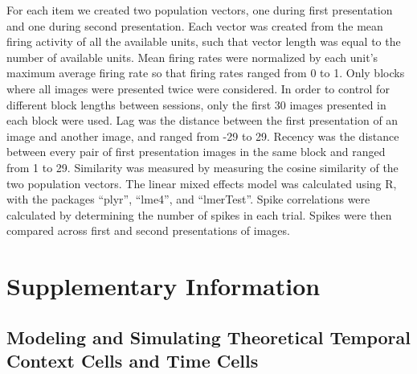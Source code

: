 \documentclass{apa}
\begin{document}
For each item we created two population vectors, one during first
presentation and one during second presentation. Each vector was created from
the mean firing activity of all the available units, such that vector length
was equal to the number of available units. Mean firing rates were normalized
by each unit's maximum average firing rate so that firing rates ranged from 0
to 1. Only blocks where all images were presented twice were considered. In
order to control for different block lengths between sessions, only the first
30 images presented in each block were used. Lag was the distance between the
first presentation of an image and another image, and ranged from -29 to 29.
Recency was the distance between every pair of first presentation images in
the same block and ranged from 1 to 29. Similarity was measured by measuring
the cosine similarity of the two population vectors. The linear mixed effects
model was calculated using R, with the packages ``plyr'', ``lme4'', and
``lmerTest''. Spike correlations were calculated by determining the number of
spikes in each trial. Spikes were then compared across first and second
presentations of images.

\nocite{Wick11,KuznEtal17,BateEtal14}


\clearpage

\setcounter{figure}{0}
\renewcommand{\thefigure}{S\arabic{figure}}

\setcounter{equation}{0}
\renewcommand{\theequation}{S\arabic{equation}}


\section{Supplementary Information}

\subsection{Modeling and Simulating Theoretical Temporal Context Cells and Time Cells}
\end{document}
